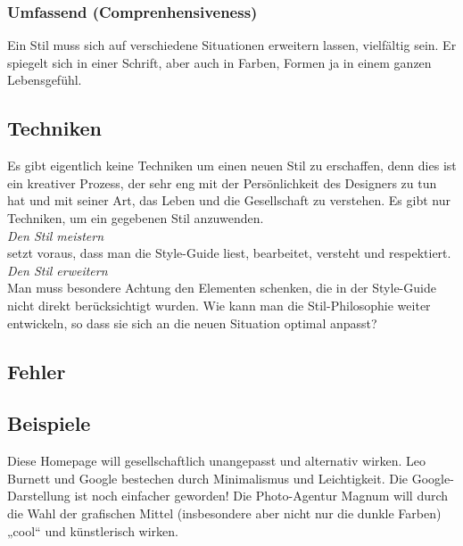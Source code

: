 \subsubsection*{Umfassend (Comprenhensiveness)}
Ein Stil muss sich auf verschiedene Situationen erweitern lassen, vielfältig sein. Er spiegelt sich in einer Schrift, aber auch in Farben, Formen ja in einem ganzen Lebensgefühl.


\subsection{Techniken}

Es gibt eigentlich keine Techniken um einen neuen Stil zu erschaffen, denn dies ist ein kreativer Prozess, der sehr eng mit der Persönlichkeit des Designers zu tun hat und mit seiner Art, das Leben und die Gesellschaft zu verstehen. Es gibt nur Techniken, um ein gegebenen Stil anzuwenden.\bigskip\\
\emph{Den Stil meistern}\\
setzt voraus, dass man die Style-Guide liest, bearbeitet, versteht und respektiert.
\emph{Den Stil erweitern}\\
Man muss besondere Achtung den Elementen schenken, die in der Style-Guide nicht direkt berücksichtigt wurden. Wie kann man die Stil-Philosophie weiter entwickeln, so dass sie sich an die neuen Situation optimal anpasst?

\subsection{Fehler}

\subsection{Beispiele}
Diese Homepage will gesellschaftlich unangepasst und alternativ wirken.
Leo Burnett und Google bestechen durch Minimalismus und Leichtigkeit.
Die Google-Darstellung ist noch einfacher geworden!
Die Photo-Agentur Magnum will durch die Wahl der grafischen Mittel (insbesondere aber nicht nur die dunkle Farben) „cool“ und künstlerisch wirken.















